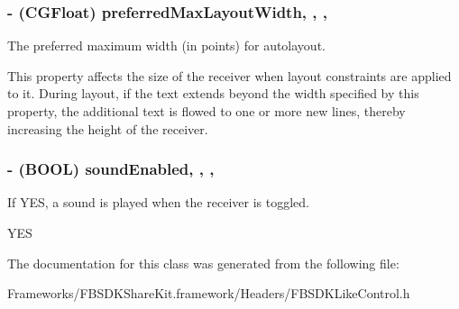 \subsubsection[{preferred\+Max\+Layout\+Width}]{\setlength{\rightskip}{0pt plus 5cm}-\/ (C\+G\+Float) preferred\+Max\+Layout\+Width\hspace{0.3cm}{\ttfamily [read]}, {\ttfamily [write]}, {\ttfamily [nonatomic]}, {\ttfamily [assign]}}\label{interface_f_b_s_d_k_like_control_a19bcd198e1f6697fa9740c82fbd00de9}
The preferred maximum width (in points) for autolayout.

This property affects the size of the receiver when layout constraints are applied to it. During layout, if the text extends beyond the width specified by this property, the additional text is flowed to one or more new lines, thereby increasing the height of the receiver. \hypertarget{interface_f_b_s_d_k_like_control_af2293652063a0b1e8e3d8ba73b343d1c}{}
\subsubsection[{sound\+Enabled}]{\setlength{\rightskip}{0pt plus 5cm}-\/ (B\+O\+O\+L) sound\+Enabled\hspace{0.3cm}{\ttfamily [read]}, {\ttfamily [write]}, {\ttfamily [nonatomic]}, {\ttfamily [assign]}}\label{interface_f_b_s_d_k_like_control_af2293652063a0b1e8e3d8ba73b343d1c}
If Y\+E\+S, a sound is played when the receiver is toggled.

Y\+E\+S 

The documentation for this class was generated from the following file\+:\begin{DoxyCompactItemize}
\item 
Frameworks/\+F\+B\+S\+D\+K\+Share\+Kit.\+framework/\+Headers/F\+B\+S\+D\+K\+Like\+Control.\+h\end{DoxyCompactItemize}
